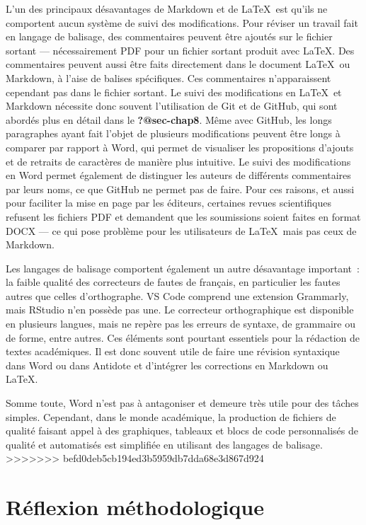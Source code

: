 \documentclass[
  letterpaper,
]{scrbook}
\begin{document}
L'un des principaux désavantages de Markdown et de \LaTeX~est qu'ils ne
comportent aucun système de suivi des modifications. Pour réviser un
travail fait en langage de balisage, des commentaires peuvent être
ajoutés sur le fichier sortant --- nécessairement PDF pour un fichier
sortant produit avec \LaTeX. Des commentaires peuvent aussi être faits
directement dans le document \LaTeX~ou Markdown, à l'aise de balises
spécifiques. Ces commentaires n'apparaissent cependant pas dans le
fichier sortant. Le suivi des modifications en \LaTeX~et Markdown
nécessite donc souvent l'utilisation de Git et de GitHub, qui sont
abordés plus en détail dans le \textbf{?@sec-chap8}. Même avec GitHub,
les longs paragraphes ayant fait l'objet de plusieurs modifications
peuvent être longs à comparer par rapport à Word, qui permet de
visualiser les propositions d'ajouts et de retraits de caractères de
manière plus intuitive. Le suivi des modifications en Word permet
également de distinguer les auteurs de différents commentaires par leurs
noms, ce que GitHub ne permet pas de faire. Pour ces raisons, et aussi
pour faciliter la mise en page par les éditeurs, certaines revues
scientifiques refusent les fichiers PDF et demandent que les soumissions
soient faites en format DOCX --- ce qui pose problème pour les
utilisateurs de \LaTeX~mais pas ceux de Markdown.

Les langages de balisage comportent également un autre désavantage
important~: la faible qualité des correcteurs de fautes de français, en
particulier les fautes autres que celles d'orthographe. VS Code comprend
une extension Grammarly, mais RStudio n'en possède pas une. Le
correcteur orthographique est disponible en plusieurs langues, mais ne
repère pas les erreurs de syntaxe, de grammaire ou de forme, entre
autres. Ces éléments sont pourtant essentiels pour la rédaction de
textes académiques. Il est donc souvent utile de faire une révision
syntaxique dans Word ou dans Antidote et d'intégrer les corrections en
Markdown ou \LaTeX.

Somme toute, Word n'est pas à antagoniser et demeure très utile pour des
tâches simples. Cependant, dans le monde académique, la production de
fichiers de qualité faisant appel à des graphiques, tableaux et blocs de
code personnalisés de qualité et automatisés est simplifiée en utilisant
des langages de balisage.
>>>>>>> befd0deb5cb194ed3b5959db7dda68e3d867d924

\hypertarget{ruxe9flexion-muxe9thodologique-1}{%
\section{Réflexion
méthodologique}\label{ruxe9flexion-muxe9thodologique-1}}
\end{document}

